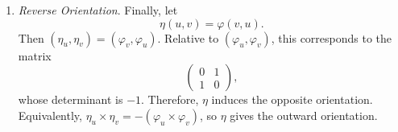 \begin{example}
\begin{enumerate}
			\item \textit{Reverse Orientation}. Finally, let
				\begin{equation}
					\eta(u,v)=\varphi(v,u).
				\end{equation}
				Then $(\eta_u,\eta_v) = (\varphi_v,\varphi_u)$. Relative to $(\varphi_u,\varphi_v)$, this corresponds to the matrix
				\begin{equation}
					\begin{pmatrix}
					0 & 1 \\
					1 & 0
					\end{pmatrix},
				\end{equation}
				whose determinant is $-1$. Therefore, $\eta$ induces the opposite orientation. Equivalently, $\eta_u \times \eta_v = -(\varphi_u \times \varphi_v)$, so $\eta$ gives the outward orientation.
		\end{enumerate}
	\end{example}

